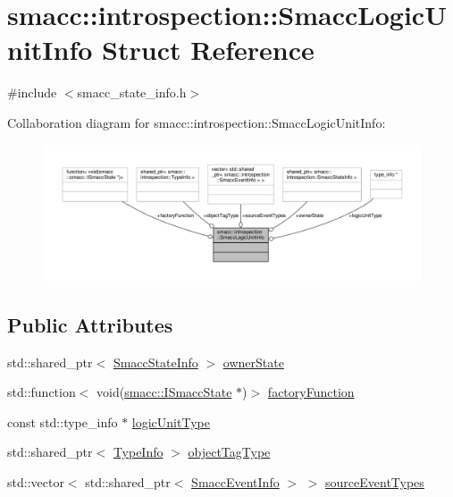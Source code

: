 \hypertarget{structsmacc_1_1introspection_1_1SmaccLogicUnitInfo}{}\section{smacc\+:\+:introspection\+:\+:Smacc\+Logic\+Unit\+Info Struct Reference}
\label{structsmacc_1_1introspection_1_1SmaccLogicUnitInfo}


{\ttfamily \#include $<$smacc\+\_\+state\+\_\+info.\+h$>$}



Collaboration diagram for smacc\+:\+:introspection\+:\+:Smacc\+Logic\+Unit\+Info\+:\nopagebreak
\begin{figure}[H]
\begin{center}
\leavevmode
\includegraphics[width=350pt]{structsmacc_1_1introspection_1_1SmaccLogicUnitInfo__coll__graph}
\end{center}
\end{figure}
\subsection*{Public Attributes}
\begin{DoxyCompactItemize}
\item 
std\+::shared\+\_\+ptr$<$ \hyperlink{classsmacc_1_1introspection_1_1SmaccStateInfo}{Smacc\+State\+Info} $>$ \hyperlink{structsmacc_1_1introspection_1_1SmaccLogicUnitInfo_a9b6a74ef053eb083efc64febe1bb9db2}{owner\+State}
\item 
std\+::function$<$ void(\hyperlink{classsmacc_1_1ISmaccState}{smacc\+::\+I\+Smacc\+State} $\ast$)$>$ \hyperlink{structsmacc_1_1introspection_1_1SmaccLogicUnitInfo_ad98da99b4913a3dcad4309005cf30072}{factory\+Function}
\item 
const std\+::type\+\_\+info $\ast$ \hyperlink{structsmacc_1_1introspection_1_1SmaccLogicUnitInfo_af399d58635280862b10116c76cb6e0f8}{logic\+Unit\+Type}
\item 
std\+::shared\+\_\+ptr$<$ \hyperlink{classsmacc_1_1introspection_1_1TypeInfo}{Type\+Info} $>$ \hyperlink{structsmacc_1_1introspection_1_1SmaccLogicUnitInfo_a4a1fc60624c6ad423c28a0bece4805ea}{object\+Tag\+Type}
\item 
std\+::vector$<$ std\+::shared\+\_\+ptr$<$ \hyperlink{structsmacc_1_1introspection_1_1SmaccEventInfo}{Smacc\+Event\+Info} $>$ $>$ \hyperlink{structsmacc_1_1introspection_1_1SmaccLogicUnitInfo_add386e83d888a7819c0132a75942fa5d}{source\+Event\+Types}
\end{DoxyCompactItemize}


